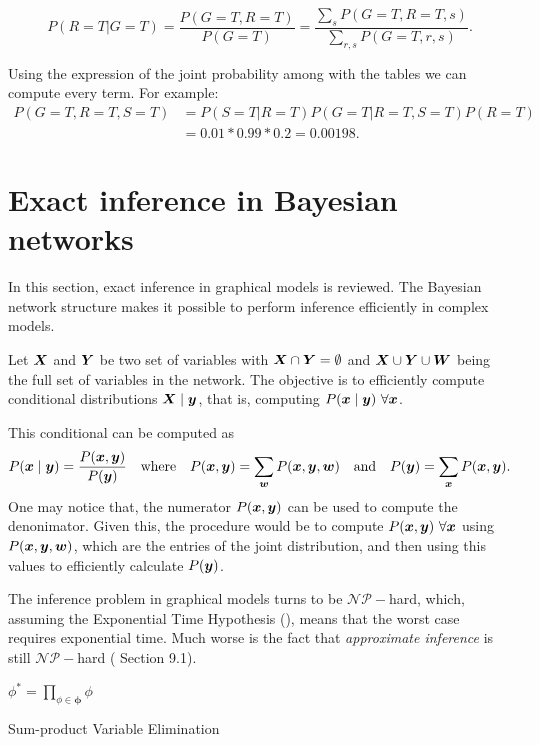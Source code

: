 \begin{exampleth}
\[
P(R = T | G = T) = \frac{P(G = T, R = T)}{P(G=T)} = \frac{\sum_{s}P(G=T, R=T,
s)}{\sum_{r,s} P(G=T, r, s)}.
\]

Using the expression of the joint probability among with the tables we can
compute every term. For example:
\[
\begin{aligned}
  P(G=T, R=T, S=T) &= P(S=T|R=T)P(G=T|R=T,S=T)P(R=T) \\
  &= 0.01 * 0.99 * 0.2 = 0.00198.
\end{aligned}
\]
\end{exampleth}

\section{Exact inference in Bayesian networks}

In this section, exact inference in graphical models is reviewed. The Bayesian network structure makes it possible to perform inference efficiently in complex models.

Let \(\bm{X}\) and \(\bm{Y}\) be two set of variables with \(\bm{X} \cap \bm{Y} = \emptyset\) and \(\bm{X} \cup \bm{Y} \cup \bm{W}\) being the full set of variables in the network. The objective is to efficiently compute conditional distributions \(\bm{X} \mid \bm{y}\), that is, computing \(P(\bm{x} \mid \bm{y})\ \forall \bm{x}\).

This conditional can be computed as
\[
  P(\bm{x} \mid \bm{y}) = \frac{P(\bm{x}, \bm{y})}{P(\bm{y})}\quad \text{where}\quad P(\bm{x}, \bm{y}) = \sum_{\bm{w}} P(\bm{x}, \bm{y}, \bm{w}) \quad \text{and} \quad P(\bm{y}) = \sum_{\bm{x}}P(\bm{x}, \bm{y}).
\]
One may notice that, the numerator \(P(\bm{x}, \bm{y})\) can be used to compute the denonimator. Given this, the procedure would be to compute \(P(\bm{x} , \bm{y}) \ \forall \bm{x}\) using \(P(\bm{x}, \bm{y}, \bm{w})\), which are the entries of the joint distribution, and then using this values to efficiently calculate \(P(\bm{y})\).

The inference problem in graphical models turns to be \(\mathcal{NP}-\)hard, which, assuming the Exponential Time Hypothesis (\cite{impagliazzo1999complexity}), means that the worst case requires exponential time. Much worse is the fact that \emph{approximate inference} is still \(\mathcal{NP}-\)hard (\cite{koller_friedman} Section 9.1).

\begin{algorithm}[t]
  \SetAlgoLined{}
  \(\phi^{*} = \prod_{\phi \in \bm{\phi}} \phi\)\;
  \KwRet{\(\phi^{*}\)}\;
  \caption{Sum-product Variable Elimination}\label{alg:ve}
\end{algorithm}

